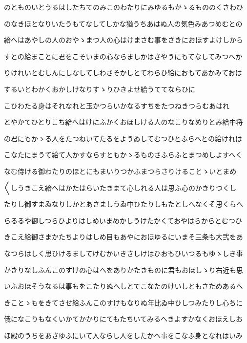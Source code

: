 \documentclass[a4paper,11pt,landscape]{ltjtarticle}
\begin{document}
\par\medskip
のとものいとうるはしたちてのみこのわたりにみゆるもかゝるもののくさわひ
\par\medskip
のなきほとなりいたうもてなしてしかな猶うちあはぬ人の気色みあつめむとの
\par\medskip
給へはあやしの人のおやゝまつ人の心はけまさむ事をさきにおほすよけしから
\par\medskip
すとの給まことに君をこそいまの心ならましかはさやうにもてなしてみつへか
\par\medskip
りけれいとむしんにしなしてしわさそかしとてわらひ給におもてあかみておは
\par\medskip
するいとわかくおかしけなりすゝりひきよせ給うててならひに
\par\medskip
こひわたる身はそれなれと玉かつらいかなるすちをたつねきつらむあはれ
\par\medskip
とやかてひとりこち給へはけにふかくおほしける人のなこりなめりとみ給中将
\par\medskip
の君にもかゝる人をたつねいてたるをようゐしてむつひとふらへとの給けれは
\par\medskip
こなたにまうて給て人かすならすともかゝるものさふらふとまつめしよすへく
\par\medskip
なむ侍ける御わたりのほとにもまいりつかふまつらさりけることゝいとまめ
\par\medskip
〱しうきこえ給へはかたはらいたきまて心しれる人は思ふ心のかきりつくし
\par\medskip
たりし御すまゐなりしかとあさましうゐ中ひたりしもたとしへなくそ思くらへ
\par\medskip
らるるや御しつらひよりはしめいまめかしうけたかくておやはらからとむつひ
\par\medskip
きこえ給御さまかたちよりはしめ目もあやにおほゆるにいまそ三条も大弐をあ
\par\medskip
なつらはしく思ひけるましてけむかいきさしけはひおもひいつるもゆゝしき事
\par\medskip
かきりなしふんこのすけの心はへをありかたきものに君もおほしゝり右近も思
\par\medskip
いふおほそうなるは事もをこたりぬへしとてこなたのけいしともさためあるへ
\par\medskip
きことゝもをきてさせ給ふんこのすけもなりぬ年比ゐ中ひしつみたりし心ちに
\par\medskip
俄になこりもなくいかてかかりにてもたちいてみるへきよすかなくおほえしお
\par\medskip
ほ殿のうちをあさゆふにいて入ならし人をしたかへ事をこなふ身となれはいみ
\par\medskip
\end{document}
